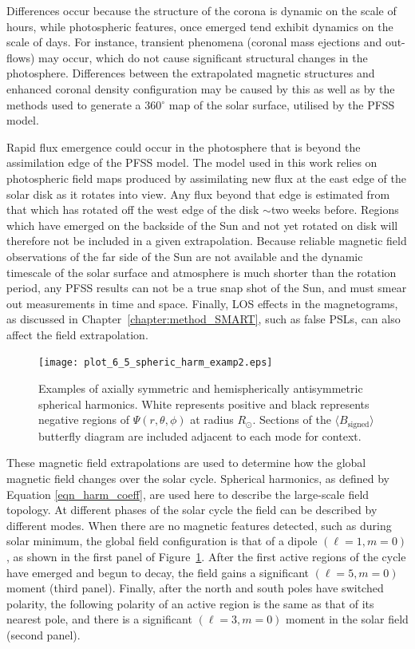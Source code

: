 Differences occur because the structure of the corona is dynamic on the scale of hours, while photospheric features, once emerged tend exhibit dynamics on the scale of days. For instance, transient phenomena (coronal mass ejections and out-flows) may occur, which do not cause significant structural changes in the photosphere. Differences between the extrapolated magnetic structures and enhanced coronal density configuration may be caused by this as well as by the methods used to generate a 360$^\circ$ map of the solar surface, utilised by the \gls{PFSS} model. 

Rapid flux emergence could occur in the photosphere that is beyond the assimilation edge of the \gls{PFSS} model. The model used in this work relies on photospheric field maps produced by assimilating new flux at the east edge of the solar disk as it rotates into view. Any flux beyond that edge is estimated from that which has rotated off the west edge of the disk $\sim$two weeks before. Regions which have emerged on the backside of the Sun and not yet rotated on disk will therefore not be included in a given extrapolation. Because reliable magnetic field observations of the far side of the Sun are not available and the dynamic timescale of the solar surface and atmosphere is much shorter than the rotation period, any \gls{PFSS} results can not be a true snap shot of the Sun, and must smear out measurements in time and space. Finally, \gls{LOS} effects in the magnetograms, as discussed in Chapter~\ref{chapter:method_SMART}, such as false \glspl{PSL}, can also affect the field extrapolation.

\begin{figure}[!t]
\centerline{\texttt{[image: plot\_6\_5\_spheric\_harm\_examp2.eps]}}
\caption[Spherical harmonic visualisations.]{Examples of axially symmetric and hemispherically antisymmetric spherical harmonics. White represents positive and black represents negative regions of $\Psi(r,\theta,\phi)$ at radius $R_{\odot}$. Sections of the $\langle B_{\mathrm{signed}} \rangle$ butterfly diagram are included adjacent to each mode for context.}
\label{plot_6_5_spheric_harm_examp}
\end{figure}

These magnetic field extrapolations are used to determine how the global magnetic field changes over the solar cycle. Spherical harmonics, as defined by Equation \ref{eqn_harm_coeff}, are used here to describe the large-scale field topology. At different phases of the solar cycle the field can be described by different modes. When there are no magnetic features detected, such as during solar minimum, the global field configuration is that of a dipole $(\ell=1,m=0)$, as shown in the first panel of Figure~\ref{plot_6_5_spheric_harm_examp}. After the first active regions of the cycle have emerged and begun to decay, the field gains a significant $(\ell=5,m=0)$ moment (third panel). Finally, after the north and south poles have switched polarity, the following polarity of an active region is the same as that of its nearest pole, and there is a significant $(\ell=3,m=0)$ moment in the solar field (second panel). 

